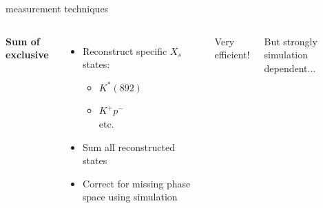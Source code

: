 \documentclass[xcolor=dvipsnames]{beamer}
\begin{document}
\begin{frame}{\safeBtoXsgamma measurement techniques}
   \scriptsize
   \begin{columns}
      \centering
      
      \centering
      \textbf{Sum of exclusive}
      \begin{itemize}
         \item Reconstruct specific $X_s$ states:
         \begin{itemize}
            \scriptsize
            \item $K^*(892)$
            \item $K^+p^-$\\
            etc.
         \end{itemize} 
         \item Sum all reconstructed states
         \item Correct for missing phase space using simulation
      \end{itemize}

      Very efficient!

      But strongly simulation dependent...


   \end{columns}



\end{frame}
\end{document}
